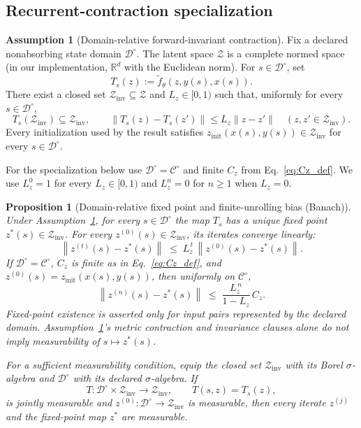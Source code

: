 \documentclass{article}
\theoremstyle{plain}
\newtheorem{proposition}[theorem]{Proposition}
\theoremstyle{definition}
\newtheorem{assumption}[theorem]{Assumption}
\theoremstyle{remark}
\newcommand{\ZZ}{\mathcal{Z}}
\newcommand{\norm}[1]{\left\lVert #1 \right\rVert}
\begin{document}
\subsection{Recurrent-contraction specialization}
\label{app:contractive_specializations}

\begin{assumption}[Domain-relative forward-invariant contraction]
\label{ass:Lip}
Fix a declared nonabsorbing state domain $\mathcal D^\circ$. The latent
space $\ZZ$ is a complete normed space (in our implementation,
$\mathbb R^d$ with the Euclidean norm). For $s\in\mathcal D^\circ$, set
\[
T_s(z):=\widetilde f_\theta(z,y(s),x(s)).
\]
There exist a closed set $\mathcal Z_{\mathrm{inv}}\subseteq\ZZ$ and
$L_z\in[0,1)$ such that, uniformly for every $s\in\mathcal D^\circ$,
\[
T_s(\mathcal Z_{\mathrm{inv}})\subseteq\mathcal Z_{\mathrm{inv}},
\qquad
\|T_s(z)-T_s(z')\|\le L_z\|z-z'\|
\quad(z,z'\in\mathcal Z_{\mathrm{inv}}).
\]
Every initialization used by the result satisfies
$z_{\mathrm{init}}(x(s),y(s))\in\mathcal Z_{\mathrm{inv}}$ for every
$s\in\mathcal D^\circ$.
\end{assumption}


For the specialization below use $\mathcal D^\circ=\mathcal C^\circ$ and
finite $C_z$ from Eq.~\eqref{eq:Cz_def}. We use $L_z^0=1$ for every
$L_z\in[0,1)$ and $L_z^n=0$ for $n\ge1$ when $L_z=0$.

\begin{proposition}[Domain-relative fixed point and finite-unrolling bias (Banach)]
\label{prop:banach}
Under Assumption~\ref{ass:Lip}, for every $s\in\mathcal D^\circ$ the map
$T_s$ has a unique fixed point $z^*(s)\in\mathcal Z_{\mathrm{inv}}$. For
every $z^{(0)}(s)\in\mathcal Z_{\mathrm{inv}}$, its iterates converge
linearly:
\begin{equation}
\norm{z^{(t)}(s) - z^*(s)}
\;\le\;
L_z^{\,t}\,\norm{z^{(0)}(s) - z^*(s)}.
\label{eq:linear_convergence}
\end{equation}
If $\mathcal D^\circ=\mathcal C^\circ$, $C_z$ is finite as in
Eq.~\eqref{eq:Cz_def}, and
$z^{(0)}(s)=z_{\mathrm{init}}(x(s),y(s))$, then uniformly on
$\mathcal C^\circ$,
\begin{equation}
\norm{z^{(n)}(s)-z^*(s)}
\;\le\;
\frac{L_z^{\,n}}{1-L_z}\,C_z.
\label{eq:finite_unrolling_bias}
\end{equation}
Fixed-point existence is asserted only for input pairs represented by
the declared domain. Assumption~\ref{ass:Lip}'s metric contraction and
invariance clauses alone do not imply measurability of $s\mapsto z^*(s)$.

For a sufficient measurability condition, equip the closed set
$\mathcal Z_{\mathrm{inv}}$ with its Borel $\sigma$-algebra and
$\mathcal D^\circ$ with its declared $\sigma$-algebra. If
\begin{equation}
T:\mathcal D^\circ\times\mathcal Z_{\mathrm{inv}}
\longrightarrow\mathcal Z_{\mathrm{inv}},
\qquad T(s,z)=T_s(z),
\label{eq:joint_measurable_recurrence}
\end{equation}
is jointly measurable and
$z^{(0)}:\mathcal D^\circ\to\mathcal Z_{\mathrm{inv}}$ is measurable, then
every iterate $z^{(j)}$ and the fixed-point map $z^*$ are measurable.
\end{proposition}
\end{document}
